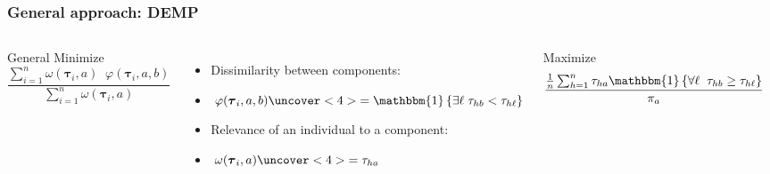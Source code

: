 \begin{frame}[t]
\frametitle{General approach: DEMP}
\small
\begin{columns}
\begin{block}{General}
Minimize
\[
\frac{ 
\sum_{i=1}^n \omega(\boldsymbol\tau_i, a) \;\; \varphi(\boldsymbol\tau_i, a, b) 
}{ 
\sum_{i=1}^n \omega(\boldsymbol\tau_i, a)
}
\]
\end{block}

\medskip
\medskip

\begin{itemize}
\item Dissimilarity between components: 
\item[] $\; \varphi(\boldsymbol\tau_i, a, b) \uncover<4>{ = \mathlarger{\mathbbm{1}}\left\{ \exists \ell \; \tau_{hb} < \tau_{h\ell}  \right\}}$
\item Relevance of an individual to a component: 
\item[] $\; \omega(\boldsymbol\tau_i, a) \uncover<4>{ = \tau_{ha}}$
\end{itemize}


%
Maximize \[ \frac{ \frac{1}{n} \sum_{h=1}^n \tau_{ha} \mathlarger{\mathbbm{1}}\left\{ \forall \ell\; \; \tau_{hb} \geq \tau_{h\ell}  \right\} }{ \pi_a } \]
\end{columns}

\end{frame} 


